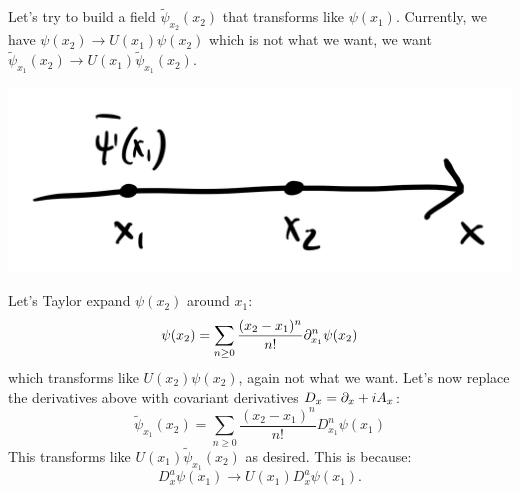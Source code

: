 Let's try to build a field $\tilde{\psi}_{x_2}(x_2)$ that transforms like $\psi(x_1)$. Currently, we have $\psi(x_2) \to U(x_1)\psi(x_2)$ which is not what we want, we want $\tilde{\psi}_{x_1}(x_2) \to U(x_1)\tilde{\psi}_{x_1}(x_2)$.

\begin{center}
    \includegraphics[scale=0.35]{Lectures/Images/lec17-nonlocalop.png}
\end{center}

Let's Taylor expand $\psi(x_2)$ around $x_1$:
\begin{equation}
    \psi(x_2) = \sum_{n \geq 0}\frac{(x_2 - x_1)^n}{n!}\partial^n_{x_1}\psi(x_2)
\end{equation}
which transforms like $U(x_2)\psi(x_2)$, again not what we want. Let's now replace the derivatives above with covariant derivatives $D_x = \partial_x + iA_x$:
\begin{equation}
    \tilde{\psi}_{x_1}(x_2) = \sum_{n \geq 0}\frac{(x_2 - x_1)^n}{n!}D_{x_1}^n\psi(x_1)
\end{equation}
This transforms like $U(x_1)\tilde{\psi}_{x_1}(x_2)$ as desired. This is because:
\begin{equation}
    D_x^a\psi(x_1) \to U(x_1)D_x^a\psi(x_1).
\end{equation}

